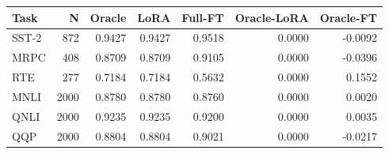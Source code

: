 \begin{tabular}{lrrrrrr}
\toprule
Task & N & Oracle & LoRA & Full-FT & Oracle-LoRA & Oracle-FT \\
\midrule
SST-2 & 872 & 0.9427 & 0.9427 & 0.9518 & 0.0000 & -0.0092 \\
MRPC & 408 & 0.8709 & 0.8709 & 0.9105 & 0.0000 & -0.0396 \\
RTE & 277 & 0.7184 & 0.7184 & 0.5632 & 0.0000 & 0.1552 \\
MNLI & 2000 & 0.8780 & 0.8780 & 0.8760 & 0.0000 & 0.0020 \\
QNLI & 2000 & 0.9235 & 0.9235 & 0.9200 & 0.0000 & 0.0035 \\
QQP & 2000 & 0.8804 & 0.8804 & 0.9021 & 0.0000 & -0.0217 \\
\bottomrule
\end{tabular}
